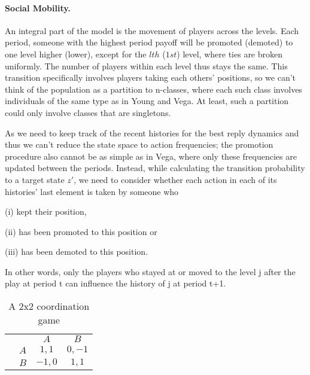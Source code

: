 \documentclass[11pt, a4paper, leqno]{article}
\begin{document}
\paragraph{Social Mobility.}

An integral part of the model is the movement of players across the levels. Each period, someone with the highest period payoff will be promoted (demoted) to one level higher (lower), except for the $lth$ ($1st$) level, where ties are broken uniformly. The number of players within each level thus stays the same. This transition specifically involves players taking each others' positions, so we can't think of the population as a partition to n-classes, where each such class involves individuals of the same type as in Young and Vega. At least, such a partition could only involve classes that are singletons. 

As we need to keep track of the recent histories for the best reply dynamics and thus we can't reduce the state space to action frequencies; the promotion procedure also cannot be as simple as in Vega, where only these frequencies are updated between the periods. Instead, while calculating the transition probability to a target state $z'$, we need to consider whether each action in each of its histories' last element is taken by someone who

(i) kept their position, 

(ii) has been promoted to this position or 

(iii) has been demoted to this position. 

In other words, only the players who stayed at or moved to the level j after the play at period t can influence the history of j at period t+1. 


\begin{table}
\begin{center}
    
    \setlength{\extrarowheight}{2pt}
    \begin{tabular}{cc|c|c|}
      & \multicolumn{1}{c}{} & \multicolumn{1}{c}{$A$}  & \multicolumn{1}{c}{$B$} \\\cline{3-4}
      & $A$ & $1,1$ & $0,-1$ \\\cline{3-4}
      & $B$ & $-1,0$ & $1,1$ \\\cline{3-4}
    \end{tabular}

\end{center}
    \caption{A 2x2 coordination game}
\end{table}
\end{document}
